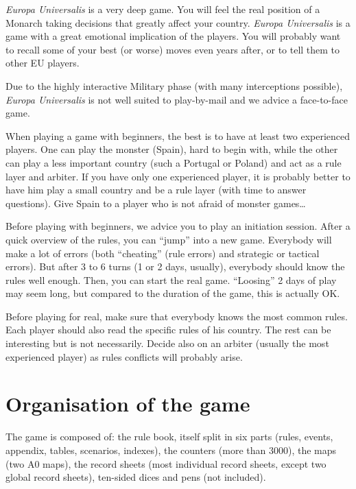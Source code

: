 \emph{Europa Universalis} is a very deep game. You will feel the real position
of a Monarch taking decisions that greatly affect your country. \emph{Europa
  Universalis} is a game with a great emotional implication of the
players. You will probably want to recall some of your best (or worse) moves
even years after, or to tell them to other EU players.

\begin{playtip}
  Due to the highly interactive Military phase (with many interceptions
  possible), \emph{Europa Universalis} is not well suited to play-by-mail and
  we advice a face-to-face game.

  When playing a game with beginners, the best is to have at least two
  experienced players. One can play the monster (Spain), hard to begin with,
  while the other can play a less important country (such a Portugal or
  Poland) and act as a rule layer and arbiter. If you have only one
  experienced player, it is probably better to have him play a small country
  and be a rule layer (with time to answer questions). Give Spain to a player
  who is not afraid of monster games\ldots

  Before playing with beginners, we advice you to play an initiation
  session. After a quick overview of the rules, you can ``jump'' into a new
  game. Everybody will make a lot of errors (both ``cheating'' (rule errors)
  and strategic or tactical errors). But after 3 to 6 turns (1 or 2 days,
  usually), everybody should know the rules well enough. Then, you can start
  the real game. ``Loosing'' 2 days of play may seem long, but compared to the
  duration of the game, this is actually OK.

  Before playing for real, make sure that everybody knows the most common
  rules. Each player should also read the specific rules of his country. The
  rest can be interesting but is not necessarily. Decide also on an arbiter
  (usually the most experienced player) as rules conflicts will probably
  arise.
\end{playtip}


\section*{Organisation of the game}
The game is composed of: the rule book, itself split in six parts (rules,
events, appendix, tables, scenarios, indexes), the counters (more than 3000),
the maps (two A0 maps), the record sheets (most individual record sheets,
except two global record sheets), ten-sided dices and pens (not included).


